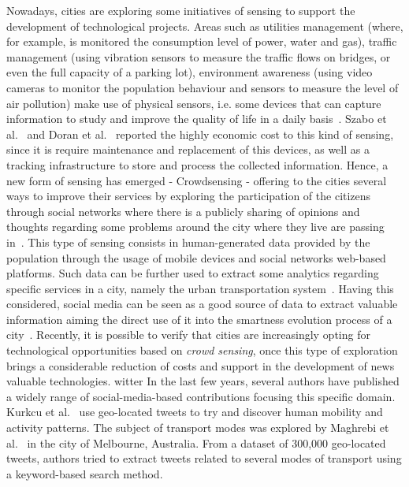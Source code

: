 Nowadays, cities are exploring some initiatives of sensing to support the development of technological projects. Areas such as utilities management (where, for example, is monitored the consumption level of power, water and gas), traffic management (using vibration sensors to measure the traffic flows on bridges, or even the full capacity of a parking lot), environment awareness (using video cameras to monitor the population behaviour and sensors to measure the level of air pollution) make use of physical sensors, i.e. some devices that can capture information to study and improve the quality of life in a daily basis~\cite{doran2015social}. Szabo et al.~\cite{szabo2013framework} and Doran et al.~\cite{doran2015social} reported the highly economic cost to this kind of sensing, since it is require maintenance and replacement of this devices, as well as a tracking infrastructure to store and process the collected information. Hence, a new form of sensing has emerged - \gls{Crowdsensing} - offering to the cities several ways to improve their services by exploring the participation of the citizens through social networks where there is a publicly sharing of  opinions and thoughts regarding some problems around the city where they live are passing in~\cite{roitman2012harnessing}. This type of sensing consists in human-generated data provided by the population through the usage of mobile devices and social networks web-based platforms. Such data can be further used to extract some analytics regarding specific services in a city, namely the urban transportation system~\cite{roitman2012harnessing}. Having this considered, social media can be seen as a good source of data to extract valuable information aiming the direct use of it into the smartness evolution process of a city~\cite{szabo2013framework}. Recently, it is possible to verify that cities are increasingly opting for technological opportunities based on \textit{crowd sensing}, once this type of exploration brings a considerable reduction of costs and support in the development of news valuable technologies.
witter
In the last few years, several authors have published a widely range of social-media-based contributions focusing this specific domain. Kurkcu et al.~\cite{kurkcu2016evaluating} use geo-located tweets to try and discover human mobility and activity patterns. The subject of transport modes was explored by Maghrebi et al.~\cite{maghrebi2016transportation} in the city of Melbourne, Australia. From a dataset of 300,000 geo-located tweets, authors tried to extract tweets related to several modes of transport using a keyword-based search method. 

